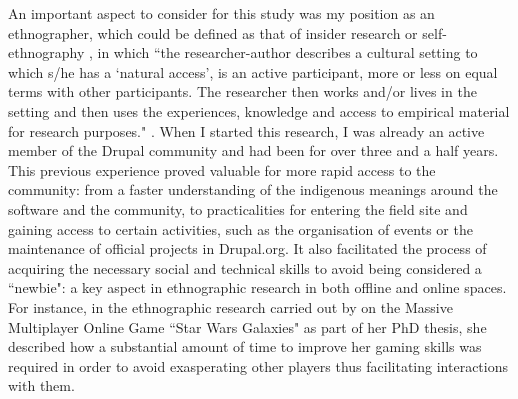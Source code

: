 An important aspect to consider for this study was my position as an ethnographer, which could be defined as that of insider research  or self-ethnography \parencite{brannick2007defense},  in which ``the researcher-author describes a cultural setting to which s/he has a `natural access', is an active participant, more or less on equal terms with other participants. The researcher then works and/or  lives  in  the  setting  and  then  uses  the  experiences,  knowledge  and access to empirical material for research purposes." \parencite[174]{alvesson2003methodology}. When I started this research, I was already an active member of the Drupal community and had been for over three and a half years. This previous experience proved valuable for more rapid access to the community: from a faster understanding of the indigenous meanings around the software and the community, to practicalities for entering the field site and gaining access to certain activities, such as the organisation of events or the maintenance of official projects in Drupal.org. It also facilitated the process of acquiring the necessary social and technical skills to avoid being considered a ``newbie": a key aspect in ethnographic research in both offline and online spaces. For instance, in the ethnographic research carried out by \textcite{sveinsdottir2008virtual} on the Massive Multiplayer Online Game ``Star Wars Galaxies" as part of her PhD thesis, she described how a substantial amount of time to improve her gaming skills was required in order to avoid exasperating other players thus facilitating interactions with them.

